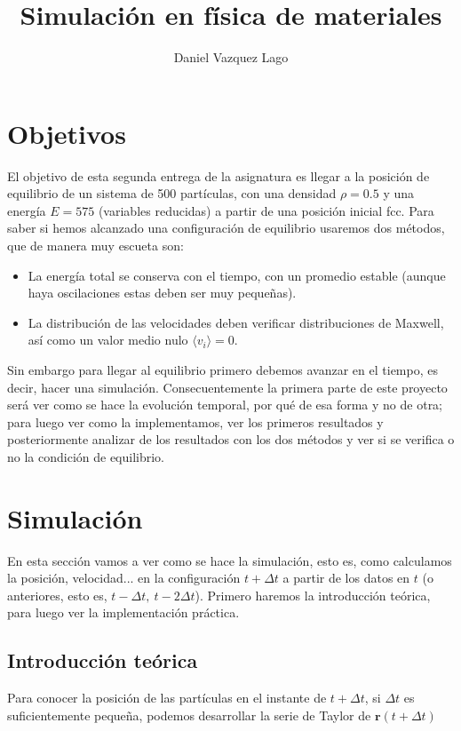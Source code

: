 \documentclass[11pt]{article} %
\author{Daniel Vazquez Lago}
\title{Simulación en física de materiales}
\newcommand{\rn}{\mathbf{r}}
\begin{document}
	
	
\maketitle
\newpage
\tableofcontents
\section{Objetivos}

El objetivo de esta segunda entrega de la asignatura es llegar a la posición de equilibrio de un sistema de 500 partículas, con una densidad $\rho=0.5$ y una energía $E=575$ (variables reducidas) a partir de una posición inicial fcc. Para saber si hemos alcanzado una configuración de equilibrio usaremos dos métodos, que de manera muy escueta son: 

\begin{itemize}
	\item La energía total se conserva con el tiempo, con un promedio estable (aunque haya oscilaciones estas deben ser muy pequeñas).
	\item La distribución de las velocidades deben verificar distribuciones de Maxwell, así como un valor medio nulo $\langle v_i \rangle = 0$. 
\end{itemize}
Sin embargo para llegar al equilibrio primero debemos avanzar en el tiempo, es decir, hacer una simulación. Consecuentemente la primera parte de este proyecto será ver como se hace la evolución temporal, por qué de esa forma y no de otra; para luego ver como la implementamos, ver los primeros resultados y posteriormente analizar de los resultados con los dos métodos y ver si se verifica o no la condición de equilibrio. 


\section{Simulación}

En esta sección vamos a ver como se hace la simulación, esto es, como calculamos la posición, velocidad... en la configuración $t+\Delta t$ a partir de los datos en $t$ (o anteriores, esto es, $t  - \Delta t, \ t - 2 \Delta t$). Primero haremos la introducción teórica, para luego ver la implementación práctica.

\subsection{Introducción teórica}

Para conocer la posición de las partículas en el instante de $t + \Delta t$, si $\Delta t$ es suficientemente pequeña, podemos desarrollar la serie de Taylor de $\rn(t+\Delta t)$
\end{document}
